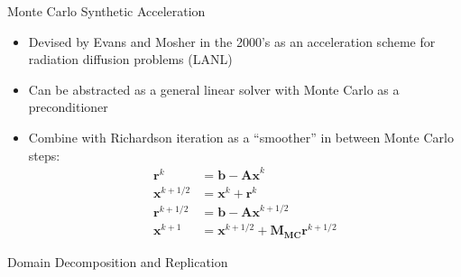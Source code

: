 \documentclass{beamer}
\begin{document}
\begin{frame}{Monte Carlo Synthetic Acceleration}
  \begin{itemize}
  \item Devised by Evans and Mosher in the 2000's as an acceleration
    scheme for radiation diffusion problems (LANL)
    \vfill
  \item Can be abstracted as a general linear solver with Monte Carlo as a
    preconditioner
    \vfill
  \item Combine with Richardson iteration as a ``smoother'' in between
    Monte Carlo steps:
    \begin{align*}
      \mathbf{r}^k &= \mathbf{b} - \mathbf{Ax}^k \\
      \mathbf{x}^{k+1/2} &= \mathbf{x}^k + \mathbf{r}^k \\
      \mathbf{r}^{k+1/2} &= \mathbf{b} - \mathbf{Ax}^{k+1/2} \\
      \mathbf{x}^{k+1} &= \mathbf{x}^{k+1/2} + \mathbf{M_{MC}} \mathbf{r}^{k+1/2}
    \end{align*}
  \end{itemize}
\end{frame}

\begin{frame}

  \center Domain Decomposition and Replication
  
\end{frame}
\end{document}
